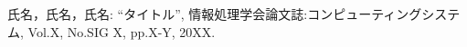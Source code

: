\documentclass[a4paper,9pt, twocolumn]{jarticle}
\begin{document}
%
%
\begin{thebibliography}{9}
\itemsep -1.7pt

{\small 氏名，氏名，氏名:      %
\newblock ``タイトル'',
\newblock 情報処理学会論文誌:コンピューティングシステム,
\newblock Vol.X,
\newblock No.SIG X,
\newblock pp.X-Y,
\newblock 20XX.}

\end{thebibliography}
\end{document}
